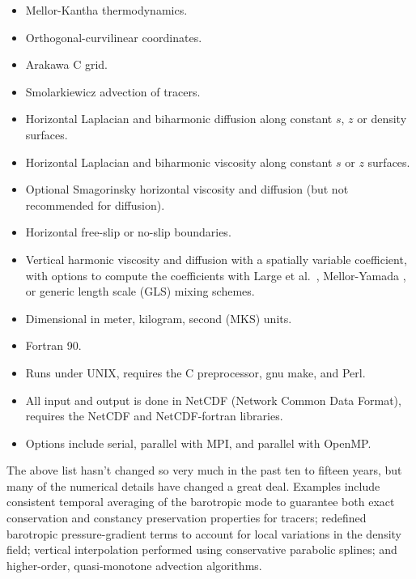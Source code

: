 \begin{klist}
\begin{itemize}
  \item Mellor-Kantha thermodynamics.
  \item Orthogonal-curvilinear coordinates.
  \item Arakawa C grid.
  \item Smolarkiewicz advection of tracers.
\end{itemize}
 \mbox{}
\begin{itemize}
  \item Horizontal Laplacian and biharmonic
    diffusion along constant $s$, $z$ or density
    surfaces.
  \item Horizontal Laplacian and biharmonic viscosity
    along constant $s$ or $z$ surfaces.
  \item Optional Smagorinsky horizontal viscosity and diffusion (but
  not recommended for diffusion).
  \item Horizontal free-slip or no-slip boundaries.
  \item Vertical harmonic viscosity and diffusion with a spatially
    variable coefficient, with options to compute the coefficients
    with Large et al.\ \cite{Large94}, Mellor-Yamada \cite{Mellor74},
    or generic length scale (GLS) \cite{Umlauf2003} mixing schemes.
\end{itemize}
 \mbox{}
\begin{itemize}
  \item Dimensional in meter, kilogram, second (MKS) units.
  \item Fortran 90.
  \item Runs under UNIX, requires the C preprocessor, gnu make, and
  Perl.
  \item All input and output is done in NetCDF \cite{netCDF} (Network
    Common Data Format), requires the NetCDF and NetCDF-fortran
    libraries.
  \item Options include serial, parallel with MPI, and parallel with
  OpenMP.
\end{itemize}
\end{klist}
The above list hasn't changed so very much in the past ten to fifteen
years, but many of the numerical details have changed a great deal.
Examples include consistent temporal averaging of the barotropic
mode to guarantee both exact conservation and constancy preservation
properties for tracers; redefined barotropic pressure-gradient terms
to account for local variations in the density field; vertical
interpolation performed using conservative parabolic splines; and
higher-order, quasi-monotone advection algorithms.

